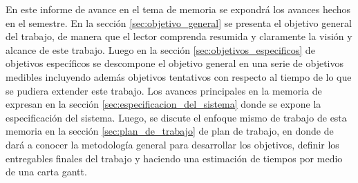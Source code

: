 \begin{intro}
En este informe de avance en el tema de memoria se expondrá los avances hechos en el semestre. En la sección \ref{sec:objetivo_general} se presenta el objetivo general del trabajo, de manera que el lector comprenda resumida y claramente la visión y alcance de este trabajo. Luego en la sección \ref{sec:objetivos_especificos} de objetivos específicos se descompone el objetivo general en una serie de objetivos medibles incluyendo además objetivos tentativos con respecto al tiempo de lo que se pudiera extender este trabajo. Los avances principales en la memoria de expresan en la sección \ref{sec:especificacion_del_sistema} donde se expone la especificación del sistema. Luego, se discute el enfoque mismo de trabajo de esta memoria en la sección \ref{sec:plan_de_trabajo} de plan de trabajo, en donde de dará a conocer la metodología general para desarrollar los objetivos, definir los entregables finales del trabajo y haciendo una estimación de tiempos por medio de una carta gantt.

\end{intro}